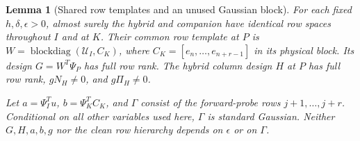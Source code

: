 \documentclass[11pt,oneside,openany,a4paper]{book}
\numberwithin{equation}{chapter}
\newtheorem{lemma}[theorem]{Lemma}
\theoremstyle{definition}
\theoremstyle{remark}
\DeclareMathOperator{\diag}{blockdiag}\DeclareMathOperator{\range}{range}
\begin{document}
\begin{lemma}[Shared row templates and an unused Gaussian block]\label{tangent:lem:shared}
For each fixed $h,\delta,\epsilon>0$, almost surely the hybrid and companion have identical row spaces throughout $I$ and at $K$. Their common row template at $P$ is $W=\diag(\mathcal U_I,C_K)$, where $C_K=[e_n,\ldots,e_{n+r-1}]$ in its physical block. Its design $G=W^T\Psi_P$ has full row rank. The hybrid column design $H$ at $P$ has full row rank, $gN_H\ne0$, and $g\Pi_H\ne0$.

Let $a=\Psi_I^Tu$, $b=\Psi_K^TC_K$, and $\Gamma$ consist of the forward-probe rows $j+1,\ldots,j+r$. Conditional on all other variables used here, $\Gamma$ is standard Gaussian. Neither $G,H,a,b,g$ nor the clean row hierarchy depends on $\epsilon$ or on $\Gamma$.
\end{lemma}
\end{document}
